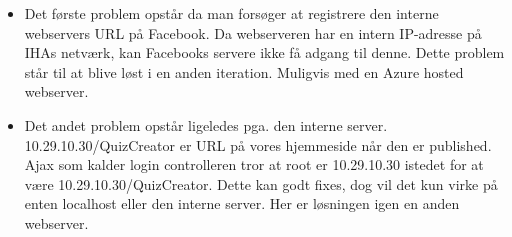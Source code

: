 \begin{itemize}
	\item Det første problem opstår da man forsøger at registrere den interne webservers URL på Facebook. Da webserveren har en intern IP-adresse på IHAs netværk, kan Facebooks servere ikke få adgang til denne. Dette problem står til at blive løst i en anden iteration. Muligvis med en Azure hosted webserver.
	\item Det andet problem opstår ligeledes pga. den interne server. 10.29.10.30/QuizCreator er URL på vores hjemmeside når den er published. Ajax som kalder login controlleren tror at root er 10.29.10.30 istedet for at være 10.29.10.30/QuizCreator. Dette kan godt fixes, dog vil det kun virke på enten localhost eller den interne server. Her er løsningen igen en anden webserver.
\end{itemize}